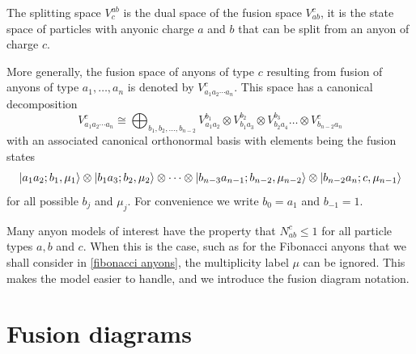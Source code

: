 \documentclass[a4paper,10pt,oneside]{book}
\theoremstyle{plain}
\theoremstyle{definition}
\theoremstyle{remark}
\DeclarePairedDelimiter\ket{\lvert}{\rangle}
\begin{document}
The splitting space $V_c^{ab}$ is the dual space of the fusion space $V_{ab}^c$, it is the state space of particles with anyonic charge $a$ and $b$ that can be split from an anyon of charge $c$.

More generally, the fusion space of anyons of type $c$ resulting from fusion of anyons of type $a_1, \ldots, a_n$ is denoted by $V_{a_1 a_2 \cdots a_n}^c$. This space has a canonical decomposition
\begin{equation}
  V_{a_1 a_2 \cdots a_n}^c \cong \bigoplus_{b_1,b_2,\ldots,b_{n-2}} V_{a_1a_2}^{b_1} \otimes V_{b_1 a_3}^{b_2} \otimes V_{b_2 a_4}^{b_3} \ldots \otimes V_{b_{n-2} a_n}^c
\end{equation}
with an associated canonical orthonormal basis with elements being the fusion states
\begin{equation}
  \ket{a_1 a_2; b_1, \mu_1} \otimes \ket{b_1 a_3; b_2, \mu_2} \otimes \cdots \otimes \ket{b_{n-3} a_{n-1}; b_{n-2}, \mu_{n-2}} \otimes \ket{b_{n-2} a_n; c, \mu_{n-1}}
\end{equation}
for all possible $b_j$ and $\mu_j$. For convenience we write $b_{0} = a_1$ and $b_{-1} = 1$.

Many anyon models of interest have the property that $N_{ab}^c \le 1$ for all particle types $a, b$ and $c$. When this is the case, such as for the Fibonacci anyons that we shall consider in \cref{fibonacci anyons}, the multiplicity label $\mu$ can be ignored. This makes the model easier to handle, and we introduce the fusion diagram notation.


\section{Fusion diagrams}
\end{document}
